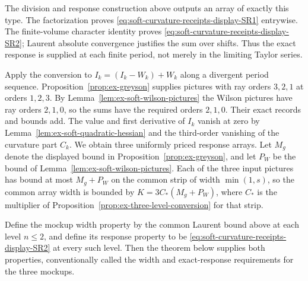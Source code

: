 The division and response construction above outputs an array of exactly
this type. The factorization proves \eqref{eq:soft-curvature-receipts-display-SR1} entrywise. The finite-volume
character identity proves \eqref{eq:soft-curvature-receipts-display-SR2}; Laurent absolute convergence justifies
the sum over shifts. Thus the exact response is supplied at each finite
period, not merely in the limiting Taylor series.

Apply the conversion to $I_k=(I_k-W_k)+W_k$ along a divergent period
sequence. Proposition~\ref{prop:ex-greyson} supplies pictures with ray
orders $3,2,1$ at orders $1,2,3$. By
Lemma~\ref{lem:ex-soft-wilson-pictures} the Wilson pictures have ray
orders $2,1,0$, so the sums have the required orders $2,1,0$. Their
exact records and bounds add. The value and first derivative of $I_k$
vanish at zero by Lemma~\ref{lem:ex-soft-quadratic-hessian} and the
third-order vanishing of the curvature part $C_k$. We obtain three
uniformly priced response arrays.
Let $M_g$ denote the displayed bound in Proposition~\ref{prop:ex-greyson},
and let $P_W$ be the bound of Lemma~\ref{lem:ex-soft-wilson-pictures}.
Each of the three input pictures has bound at most $M_g+P_W$ on the
common strip of width $\min(1,s)$, so the common array width is bounded
by $K=3C_*(M_g+P_W)$, where $C_*$ is the multiplier of
Proposition~\ref{prop:ex-three-level-conversion} for that strip.

Define the mockup width property by the common Laurent bound above at each
level $n\leq2$, and define its response property to be \eqref{eq:soft-curvature-receipts-display-SR2} at every
such level. Then the theorem below supplies both properties, conventionally
called the width and exact-response requirements for the three mockups.

